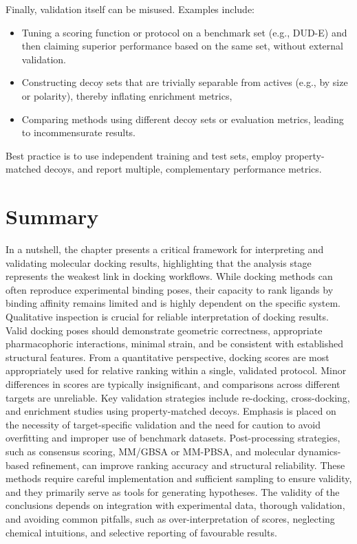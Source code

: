 \documentclass[12pt]{article}
\begin{document}
Finally, validation itself can be misused. Examples include:

\begin{itemize}
  \item Tuning a scoring function or protocol on a benchmark set (e.g., DUD-E) and then claiming superior performance based on the same set, without external validation\cite{CH8_DUD-E2012}.
  \item Constructing decoy sets that are trivially separable from actives (e.g., by size or polarity), thereby inflating enrichment metrics,
  \item Comparing methods using different decoy sets or evaluation metrics, leading to incommensurate results.
\end{itemize}

Best practice is to use independent training and test sets, employ property-matched decoys, and report multiple, complementary performance metrics.

\section{Summary}

In a nutshell, the chapter presents a critical framework for interpreting and validating molecular docking results, highlighting that the analysis stage represents the weakest link in docking workflows. While docking methods can often reproduce experimental binding poses, their capacity to rank ligands by binding affinity remains limited and is highly dependent on the specific system. Qualitative inspection is crucial for reliable interpretation of docking results. Valid docking poses should demonstrate geometric correctness, appropriate pharmacophoric interactions, minimal strain, and be consistent with established structural features. From a quantitative perspective, docking scores are most appropriately used for relative ranking within a single, validated protocol. Minor differences in scores are typically insignificant, and comparisons across different targets are unreliable. Key validation strategies include re-docking, cross-docking, and enrichment studies using property-matched decoys. Emphasis is placed on the necessity of target-specific validation and the need for caution to avoid overfitting and improper use of benchmark datasets. Post-processing strategies, such as consensus scoring, MM/GBSA or MM-PBSA, and molecular dynamics-based refinement, can improve ranking accuracy and structural reliability. These methods require careful implementation and sufficient sampling to ensure validity, and they primarily serve as tools for generating hypotheses. The validity of the conclusions depends on integration with experimental data, thorough validation, and avoiding common pitfalls, such as over-interpretation of scores, neglecting chemical intuitions, and selective reporting of favourable results.



\end{document}
